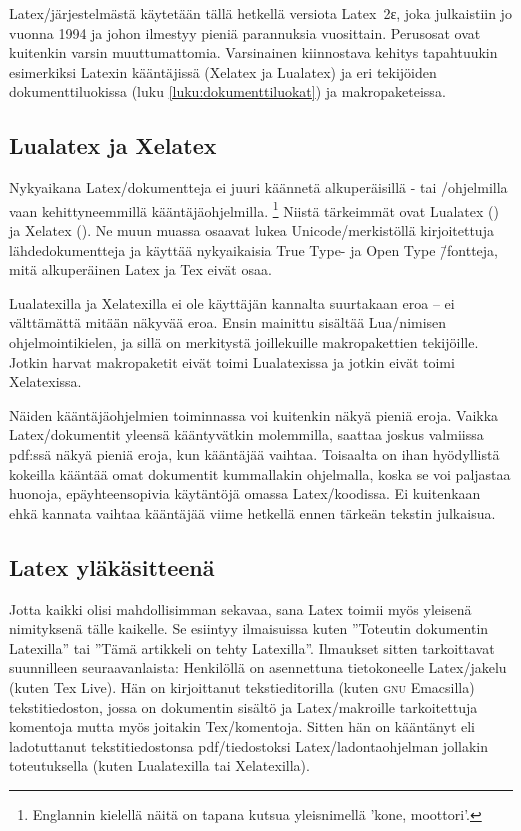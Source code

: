 Latex\-/järjestelmästä käytetään tällä hetkellä versiota
\marginpar{\LaTeXe} Latex~2ε, joka julkaistiin jo vuonna 1994 ja johon
ilmestyy pieniä parannuksia vuosittain. Perusosat ovat kuitenkin varsin
muuttumattomia. Varsinainen kiinnostava kehitys tapahtuukin esimerkiksi
Latexin kääntäjissä (Xelatex ja Lualatex) ja eri tekijöiden
dokumenttiluokissa (luku \ref{luku:dokumenttiluokat}) ja
makropaketeissa.

\subsection{Lualatex ja Xelatex}

Nykyaikana Latex\-/dokumentteja ei juuri käännetä alkuperäisillä
- tai \-/ohjelmilla vaan kehittyneemmillä
kään\-täjä\-ohjel\-milla.%
\footnote{Englannin kielellä näitä on tapana kutsua yleisnimellä
  \emph{} 'kone, moottori'.} Niistä tärkeimmät ovat
Lualatex () ja Xelatex (). Ne muun muassa
osaavat lukea Unicode\-/merkistöllä kirjoitettuja lähdedokumentteja ja
käyttää nyky\-aikaisia True Type- ja Open Type \=/fontteja, mitä
alkuperäinen Latex ja Tex eivät osaa.

Lualatexilla ja Xelatexilla ei ole käyttäjän kannalta suurtakaan eroa --
ei välttämättä mitään näkyvää eroa. Ensin mainittu sisältää
Lua\-/nimisen ohjelmointikielen, ja sillä on merkitystä joillekuille
makropakettien tekijöille. Jotkin harvat makropaketit eivät toimi
Lualatexissa ja jotkin eivät toimi Xelatexissa.

Näiden kääntäjä\-ohjelmien toiminnassa voi kuitenkin näkyä pieniä eroja.
Vaikka Latex\-/dokumentit yleensä kääntyvätkin molemmilla, saattaa
joskus valmiissa pdf:ssä näkyä pieniä eroja, kun kääntäjää vaihtaa.
Toisaalta on ihan hyödyllistä kokeilla kääntää omat dokumentit
kummallakin ohjelmalla, koska se voi paljastaa huonoja, epäyhteensopivia
käytäntöjä omassa Latex\-/koodissa. Ei kuitenkaan ehkä kannata vaihtaa
kääntäjää viime hetkellä ennen tärkeän tekstin julkaisua.

\subsection{Latex yläkäsitteenä}

Jotta kaikki olisi mahdollisimman sekavaa, sana Latex toimii myös
yleisenä nimityksenä tälle kaikelle. Se esiintyy ilmaisuissa kuten
''Toteutin dokumentin Latexilla'' tai ''Tämä artikkeli on tehty
Latexilla''. Ilmaukset sitten tarkoittavat suunnilleen seuraavanlaista:
Henkilöllä on asennettuna tietokoneelle Latex\-/jakelu (kuten Tex Live).
Hän on kirjoittanut tekstieditorilla (kuten \textsc{gnu} Emacsilla)
tekstitiedoston, jossa on dokumentin sisältö ja Latex\-/makroille
tarkoitettuja komentoja mutta myös joitakin Tex\-/komentoja. Sitten hän
on kääntänyt eli ladotuttanut tekstitiedostonsa pdf\-/tiedostoksi
Latex\-/ladontaohjelman jollakin toteutuksella (kuten Lualatexilla tai
Xelatexilla).

